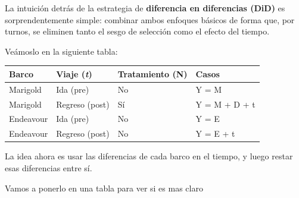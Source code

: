 \documentclass[
  letterpaper,
  DIV=11,
  numbers=noendperiod,
  oneside]{scrreprt}
\begin{document}
La intuición detrás de la estrategia de \textbf{diferencia en
diferencias (DiD)} es sorprendentemente simple: combinar ambos enfoques
básicos de forma que, por turnos, se eliminen tanto el sesgo de
selección como el efecto del tiempo.

Veámoslo en la siguiente tabla:

\begin{longtable}[]{@{}llll@{}}
\toprule()
Barco & Viaje (\emph{t}) & Tratamiento (N) & Casos \\
\midrule()
\endhead
Marigold & Ida (pre) & No & Y = M \\
Marigold & Regreso (post) & Sí & Y = M + D + t \\
Endeavour & Ida (pre) & No & Y = E \\
Endeavour & Regreso (post) & No & Y = E + t \\
\bottomrule()
\end{longtable}

\smallskip

\medskip

La idea ahora es usar las diferencias de cada barco en el tiempo, y
luego restar esas diferencias entre sí.

Vamos a ponerlo en una tabla para ver si es mas claro
\end{document}

